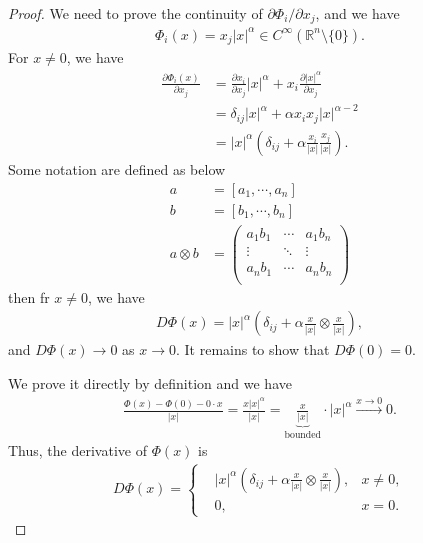 \documentclass[12pt,leqno]{amsart}
\theoremstyle{definition}
\begin{document}
\begin{proof}
We need to prove the continuity of $\partial \Phi_i/\partial x_j$, and we have 
\begin{align*}
    \Phi_i (x) = x_j |x|^\alpha \in C^\infty \left( \mathbb{R}^n\setminus \{0\}\right).
\end{align*}
For $x\neq 0$, we have
\begin{align*}
    \frac{\partial \Phi_i(x)}{\partial x_j} & = \frac{\partial x_i}{\partial x_j} |x|^\alpha + x_i \frac{\partial |x|^\alpha}{\partial x_j} \\
    & = \delta_{ij} |x|^\alpha + \alpha x_i x_j |x|^{\alpha - 2} \\
    & = |x|^\alpha \left( \delta_{ij} + \alpha \frac{x_i}{|x|} \frac{x_j}{|x|} \right).
\end{align*}
Some notation are defined as below 
\begin{align*}
    a & = \left[a_1,\cdots,a_n\right]\\
    b & = \left[b_1,\cdots,b_n\right]\\
    a \otimes b & = \begin{pmatrix}
        a_1 b_1 & \cdots &  a_1 b_n\\
        \vdots  & \ddots &  \vdots \\
        a_n b_1 & \cdots & a_n b_n \\
    \end{pmatrix}
\end{align*}
then fr $x\neq 0$, we have 
\begin{align*}
    D\Phi(x) = |x|^\alpha \left( \delta_{ij} + \alpha \frac{x}{|x|} \otimes \frac{x}{|x|} \right),
\end{align*}
and $D\Phi(x) \to 0$ as $x \to 0$. It remains to show that $D\Phi(0) = 0$. 

We prove it directly by definition and we have 
\begin{align*}
    \frac{\Phi(x) - \Phi(0) - 0\cdot x}{|x|} = \frac{x|x|^\alpha}{|x|} = \underbrace{\frac{x}{|x|}}_{\text{bounded}} \cdot |x|^\alpha \xrightarrow{x \to 0} 0.
\end{align*}
Thus, the derivative of $\Phi(x)$ is
\begin{align*}
    D\Phi(x) = \left\{
    \begin{aligned}
        & |x|^\alpha \left( \delta_{ij} + \alpha \frac{x}{|x|} \otimes \frac{x}{|x|} \right), & x \neq 0,\\
        & 0, & x = 0.
    \end{aligned}
    \right.
\end{align*}
\end{proof}
\end{document}
